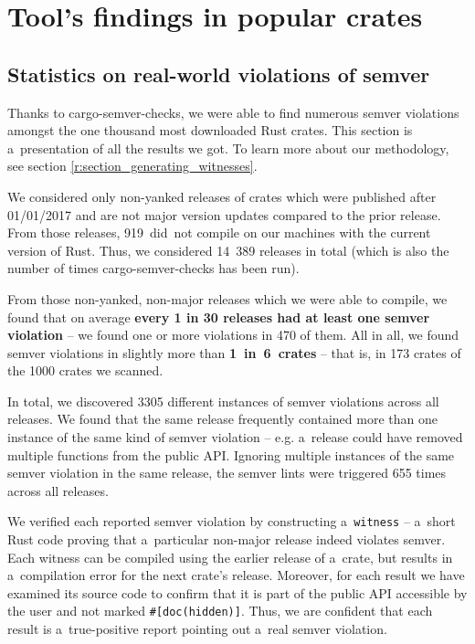 \documentclass[licencjacka,en]{pracamgr}
\begin{document}

\chapter{Tool's findings in popular crates}\label{r:chapter_semver_crater}

\section{Statistics on real-world violations of semver}\label{r:section_results_statistics}

Thanks to cargo-semver-checks, we were able to find numerous semver violations
amongst the one thousand most downloaded Rust crates.
This section is a~presentation of all the results we got. To learn more about
our methodology, see section \ref{r:section_generating_witnesses}.

We considered only non-yanked releases of crates which were published
after 01/01/2017 and are not major version updates compared to the prior release. From those
releases, \mbox{919 did not} compile on our machines with the current version of Rust.
Thus, we considered \mbox{14 389} releases in total (which is also the number of times
cargo-semver-checks has been run).

From those non-yanked, non-major releases which we were able to compile, we found that
on average \textbf{every 1 in 30 releases had at least one semver violation}
-- we found one or more violations in 470 of them.
All in all, we found semver violations in slightly more than \mbox{\textbf{1 in 6 crates}}
-- that is, in 173 crates of the 1000 crates we scanned.

In total, we discovered 3305 different instances of semver violations across all releases.
We found that the same release frequently contained more than one instance of the same kind
of semver violation -- e.g. a~release could have removed multiple functions from the public API.
Ignoring multiple instances of the same semver violation in the same release, the semver lints
were triggered 655 times across all releases.

We verified each reported semver violation by constructing a~\texttt{witness} -- a~short Rust code
proving that a~particular non-major release indeed violates semver.
Each witness can be compiled using the earlier release of a~crate,
but results in a~compilation error for the next crate's release.
Moreover, for each result we have examined its source code to confirm
that it is part of the public API accessible by the user and not marked \texttt{\#[doc(hidden)]}.
Thus, we are confident that each result is a~true-positive report pointing out a~real
semver violation.
\end{document}
